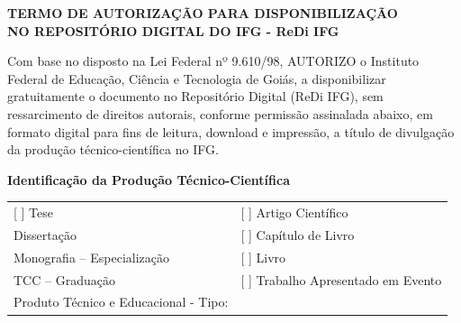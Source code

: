 
\noindent
\begin{center}
	{\bfseries\normalsize TERMO DE AUTORIZAÇÃO PARA DISPONIBILIZAÇÃO \\ NO REPOSITÓRIO DIGITAL DO IFG - ReDi IFG}
\end{center}

\vspace{0.25cm}

Com base no disposto na Lei Federal nº 9.610/98, AUTORIZO o Instituto Federal de Educação, Ciência e Tecnologia de Goiás, a disponibilizar gratuitamente o documento no Repositório Digital (ReDi IFG), sem ressarcimento de direitos autorais, conforme permissão assinalada abaixo, em formato digital para fins de leitura, download e impressão, a título de divulgação da produção técnico-científica no IFG.

\vspace{0.25cm}

\noindent\textbf{Identificação da Produção Técnico-Científica}
\vspace{0.25cm}

\noindent
\begin{tabular}{p{} p{7cm}}
	[ \hspace{0.25cm} ] Tese & [\hspace{0.25cm} ] Artigo Científico \\[0.25cm]
	[ \hspace{0.25cm} ] Dissertação & [ \hspace{0.25cm} ] Capítulo de Livro \\[0.25cm]
	[ \hspace{0.25cm} ] Monografia – Especialização & [ \hspace{0.25cm} ] Livro \\[0.25cm]
	[ \hspace{0.25cm} ] TCC – Graduação & [ \hspace{0.25cm} ] Trabalho Apresentado em Evento \\[0.25cm]
	[ \hspace{0.25cm} ] Produto Técnico e Educacional - Tipo:  & \\[0.25cm]
\end{tabular}

